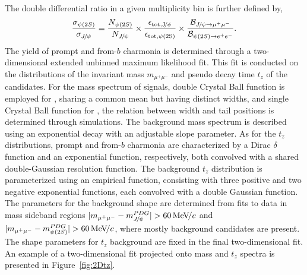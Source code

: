 The double differential ratio in a given multiplicity bin is further defined by,
\begin{equation}
    \frac{\sigma_{{\psi{(2S)}}}}{\sigma_{{{J\mskip -3mu/\mskip -2mu\psi}}}} =
    \frac{N_{{\psi{(2S)}}}}{N_{{{J\mskip -3mu/\mskip -2mu\psi}}}} \times
    \frac{\epsilon_{\mathrm{tot,{{J\mskip -3mu/\mskip -2mu\psi}}}}} {\epsilon_{\mathrm{tot,{\psi{(2S)}}}}} \times
    \frac{\mathcal{B}_{{{J\mskip -3mu/\mskip -2mu\psi}} \rightarrow \mu^+ \mu^-}}{\mathcal{B}_{{\psi{(2S)}}\rightarrow e^+e^-}}.
    \label{Rsingle}
\end{equation}
The yield of prompt and from-$b$ charmonia is determined through a two-dimensional extended unbinned maximum likelihood fit. This fit is conducted on the distributions of the invariant mass $m_{\mu^+\mu^-}$ and pseudo decay time $t_z$ of the candidates. For the mass spectrum of signals, double Crystal Ball function is employed for \jpsi, sharing a common mean but having distinct widths, and single Crystal Ball function for \psitwos, the relation between width and tail positions is determined through simulations. The background mass spectrum is described using an exponential decay with an adjustable slope parameter. As for the $t_z$ distributions, prompt and from-$b$ charmonia are characterized by a Dirac $\delta$ function and an exponential function, respectively, both convolved with a shared double-Gaussian resolution function. The background $t_z$ distribution is parameterized using an empirical function, consisting with three positive and two negative exponential functions, each convolved with a double Gaussian function. The parameters for the background shape are determined from fits to data in mass sideband regions $|m_{\mu^+\mu^-}-m_{\jpsi}^{PDG}|>60\mevc$ and $|m_{\mu^+\mu^-}-m_{\psitwos}^{PDG}|>60\mevc$, where mostly background candidates are present. The shape parameters for $t_z$ background are fixed in the final two-dimensional fit. An example of a two-dimensional fit projected onto mass and $t_z$ spectra is presented in Figure~\ref{fig:2Dtz}.

